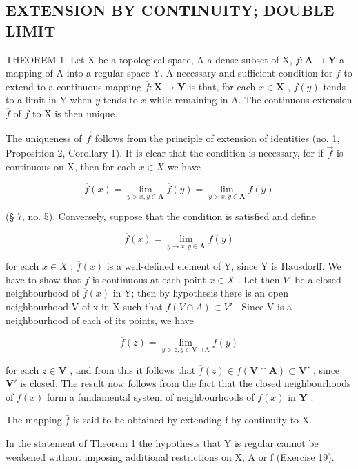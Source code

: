 \subsection{EXTENSION BY CONTINUITY; DOUBLE LIMIT}

THEOREM 1. Let X be a topological space, A a dense subset of X, \(f: \mathbf{A} \to \mathbf{Y}\) a mapping of A into a regular space Y. A necessary and sufficient condition for \(f\) to extend to a continuous mapping \(\overline{f}: \mathbf{X} \to \mathbf{Y}\) is that, for each \(x \in \mathbf{X}\) , \(f(y)\) tends to a limit in Y when \(y\) tends to \(x\) while remaining in A. The continuous extension \(\overline{f}\) of \(f\) to X is then unique.

The uniqueness of \(\vec{f}\) follows from the principle of extension of identities (no. 1, Proposition 2, Corollary 1). It is clear that the condition is necessary, for if \(\vec{f}\) is continuous on X, then for each \(x \in X\) we have

\[
\overline {{f}} (x) = \lim _ {y > x, y \in \mathbf {A}} \overline {{f}} (y) = \lim _ {y > x, y \in \mathbf {A}} f (y)
\]

(§ 7, no. 5). Conversely, suppose that the condition is satisfied and define

\[
\overline {{f}} (x) = \lim _ {y \rightarrow x, y \in \mathbf {A}} f (y)
\]

for each \(x \in X\) ; \(\overline{f}(x)\) is a well-defined element of Y, since Y is Hausdorff. We have to show that \(\overline{f}\) is continuous at each point \(x \in X\) . Let then \(V'\) be a closed neighbourhood of \(\overline{f}(x)\) in Y; then by hypothesis there is an open neighbourhood V of x in X such that \(f(V \cap A) \subset V'\) . Since V is a neighbourhood of each of its points, we have

\[
\overline {{f}} (z) = \lim _ {y > z, y \in \mathrm{V} \cap \mathrm{A}} f (y)
\]

for each \(z \in \mathbf{V}\) , and from this it follows that \(\overline{f}(z) \in f(\mathbf{V} \cap \mathbf{A}) \subset \mathbf{V}'\) , since \(\mathbf{V}'\) is closed. The result now follows from the fact that the closed neighbourhoods of \(f(x)\) form a fundamental system of neighbourhoods of \(f(x)\) in \(\mathbf{Y}\) .

The mapping \(\bar{f}\) is said to be obtained by extending f by continuity to X.

In the statement of Theorem 1 the hypothesis that Y is regular cannot be weakened without imposing additional restrictions on X, A or f (Exercise 19).

